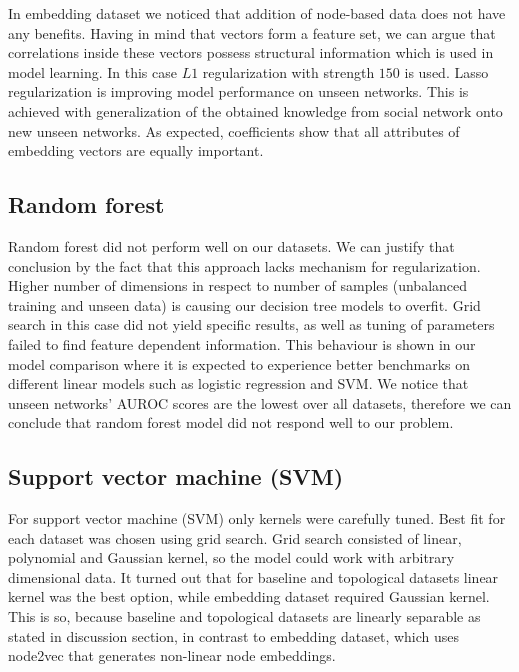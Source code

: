 \documentclass[9pt,twocolumn,twoside]{pnas-new}
\begin{document}
In embedding dataset we noticed that addition of node-based data does not have any benefits. Having in mind that vectors form a feature set, we can argue that correlations inside these vectors possess structural information which is used in model learning. In this case $L1$ regularization with strength $150$ is used. Lasso regularization is improving model performance on unseen networks. This is achieved with generalization of the obtained knowledge from social network onto new unseen networks. As expected, coefficients show that all attributes of embedding vectors are equally important.






\subsection*{Random forest}

Random forest did not perform well on our datasets. We can justify that conclusion by the fact that this approach lacks mechanism for regularization. Higher number of dimensions in respect to number of samples (unbalanced training and unseen data) is causing our decision tree models to overfit. Grid search in this case did not yield specific results, as well as tuning of parameters failed to find feature dependent information. This behaviour is shown in our model comparison where it is expected to experience better benchmarks on different linear models such as logistic regression and SVM. We notice that unseen networks' AUROC scores are the lowest over all datasets, therefore we can conclude that random forest model did not respond well to our problem.



\subsection*{Support vector machine (SVM)}

For support vector machine (SVM) only kernels were carefully tuned. Best fit for each dataset was chosen using grid search. Grid search consisted of linear, polynomial and Gaussian kernel, so the model could work with arbitrary dimensional data. It turned out that for baseline and topological datasets linear kernel was the best option, while embedding dataset required Gaussian kernel. This is so, because baseline and topological datasets are linearly separable as stated in discussion section, in contrast to embedding dataset, which uses node2vec that generates non-linear node embeddings.
\end{document}
